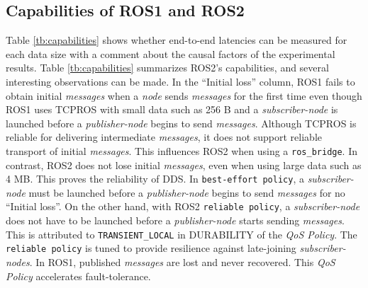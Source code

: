 \documentclass{sig-alternate-05-2015}
\begin{document}
\vspace{-1mm}
\subsection{Capabilities of ROS1 and ROS2}
\label{sec:capacity}

Table \ref{tb:capabilities} shows whether end-to-end latencies can be measured for each data size with a comment about the causal factors of the experimental results.
Table \ref{tb:capabilities} summarizes ROS2's capabilities, and several interesting observations can be made.
In the ``Initial loss'' column, ROS1 fails to obtain initial \emph{messages} when a \emph{node} sends \emph{messages} for the first time even though ROS1 uses TCPROS with small data such as 256 B and a \emph{subscriber-node} is launched before a \emph{publisher-node} begins to send \emph{messages}.
Although TCPROS is reliable for delivering intermediate \emph{messages}, it does not support reliable transport of initial \emph{messages}.
This influences ROS2 when using a \texttt{ros\_bridge}.
In contrast, ROS2 does not lose initial \emph{messages}, even when using large data such as 4 MB.
This proves the reliability of DDS.
In \texttt{best-effort policy}, a \emph{subscriber-node} must be launched before a \emph{publisher-node} begins to send \emph{messages} for no ``Initial loss''.
On the other hand, with ROS2 \texttt{reliable policy}, a \emph{subscriber-node} does not have to be launched before a \emph{publisher-node} starts sending \emph{messages}.
This is attributed to \texttt{TRANSIENT\_LOCAL} in DURABILITY of the \emph{QoS Policy}.
The \texttt{reliable policy} is tuned to provide resilience against late-joining \emph{subscriber-nodes}.
In ROS1, published \emph{messages} are lost and never recovered.
This \emph{QoS Policy} accelerates fault-tolerance.
\end{document}
